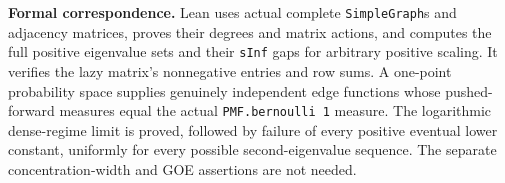 \documentclass[11pt]{article}
\begin{document}
\textbf{Formal correspondence.} Lean uses actual complete \texttt{SimpleGraph}s and adjacency matrices, proves their degrees and matrix actions, and computes the full positive eigenvalue sets and their \texttt{sInf} gaps for arbitrary positive scaling. It verifies the lazy matrix's nonnegative entries and row sums. A one-point probability space supplies genuinely independent edge functions whose pushed-forward measures equal the actual \texttt{PMF.bernoulli 1} measure. The logarithmic dense-regime limit is proved, followed by failure of every positive eventual lower constant, uniformly for every possible second-eigenvalue sequence. The separate concentration-width and GOE assertions are not needed.
\end{document}

